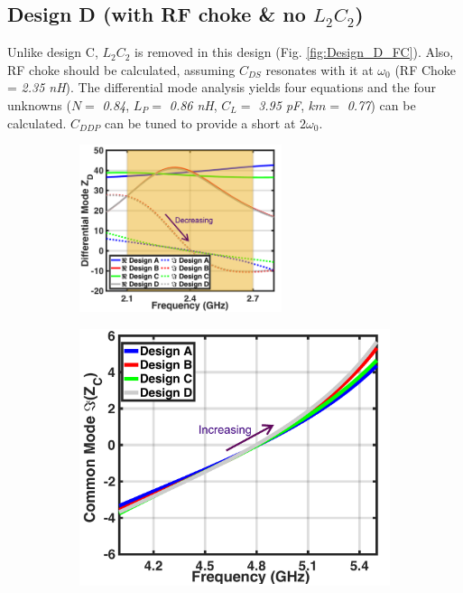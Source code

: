 \documentclass[conference]{IEEEtran}
\begin{document}
\subsection{Design D (with RF choke \& no $L_2C_2$)}
 Unlike design C, $L_2C_2$ is removed in this design (Fig. \ref{fig:Design_D_FC}). Also, RF choke should be calculated, assuming $C_{DS}$ resonates with it at $\omega_0$ (RF Choke = \textit{2.35 nH}).
The differential mode analysis yields four equations and the four unknowns ($N =$ \textit{0.84}, $L_P =$ \textit{0.86 nH}, $C_L =$ \textit{3.95 pF}, $km =$ \textit{0.77}) can be calculated.
$C_{DDP}$ can be tuned to provide a short at $2\omega_0$.

\begin{figure}[!t]
	\captionsetup{font=footnotesize}
	\centering
	\begin{subfigure}{0.5\textwidth}
		\centering
		\includegraphics[width=0.65\textwidth]{Images/Output_Network_Comp/Comp_1H.pdf}
		\caption{}
		\label{fig:Comp_1H}
	\end{subfigure}
	\begin{subfigure}{0.24\textwidth}
		\includegraphics[width=1\textwidth]{Images/Output_Network_Comp/Comp_2H_imag.pdf}

\end{subfigure}
\end{figure}
\end{document}
